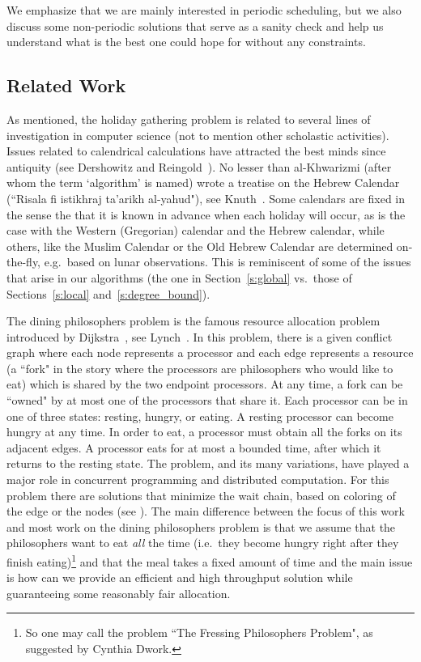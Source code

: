 \documentclass[11pt]{article}
\begin{document}
We emphasize that we are mainly interested in periodic scheduling, but we also discuss some non-periodic solutions that serve as a sanity check and help us understand what is the best one could hope for without any constraints. 

\subsection{Related Work}\label{ss:related_work}

As mentioned, the holiday gathering problem is related to several lines of investigation in computer science (not to mention other scholastic activities).
Issues related to calendrical calculations have attracted the best minds since antiquity (see Dershowitz and Reingold~\cite{DershowitzN07}). No lesser than al-Khwarizmi (after whom the term `algorithm' is named) wrote a treatise on the Hebrew Calendar (``Risala fi istikhraj ta'arikh al-yahud"), see Knuth~\cite{Knuth79}. Some calendars are fixed in the sense the that it is known in advance when each holiday will occur, as is the case with the Western (Gregorian) calendar and the Hebrew calendar, while others, like the Muslim Calendar or the Old Hebrew Calendar are determined on-the-fly, e.g.\  based on lunar observations. This is reminiscent of some of the issues that arise in our algorithms (the one in Section~\ref{s:global} vs.\ those of Sections~\ref{s:local} and~\ref{s:degree_bound}).

The dining philosophers problem is the famous  resource allocation problem introduced by Dijkstra~\cite{Dijkstra71}, see Lynch~\cite{Lynch96}. In this problem,
there is a given conflict graph where each node represents a processor and each edge represents a resource (a ``fork" in the story where the processors are philosophers who would like to eat) which is shared by the two
endpoint processors.  At any time, a fork can be ``owned" by
at most one of the processors that share it. Each processor can be in one of three
states: resting, hungry, or eating. A resting processor can become hungry at any time. In order to eat, a processor must obtain all the forks on its adjacent edges.
A processor eats for at most a bounded time, after which it returns to the
resting state. The problem, and its many variations, have played a major role in
concurrent programming and distributed computation.
For this problem there are solutions that minimize the wait chain, based on coloring of the edge or the nodes (see \cite{Lynch81, StyerP88, ChoyS95, NaorS95, MayerNS95}). The main difference between the focus of this work and most work on the dining philosophers problem is that we  assume that the  philosophers want to eat {\em all} the time (i.e.\ they become hungry right after they finish eating)\footnote{So one may call the problem ``The Fressing Philosophers Problem", as suggested by Cynthia Dwork.} and that the meal takes a fixed amount of time and the main issue is how can we provide an efficient and high throughput solution  while guaranteeing some  reasonably fair allocation.
\end{document}
